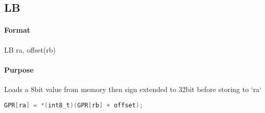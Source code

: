 \subsection{LB}


\paragraph{Format} LB ra, offset(rb)

\paragraph{Purpose} Loads a 8bit value from memory then sign extended to 32bit before storing to `ra`

\begin{lstlisting}[language=C]
    GPR[ra] = *(int8_t)(GPR[rb] + offset);
\end{lstlisting}